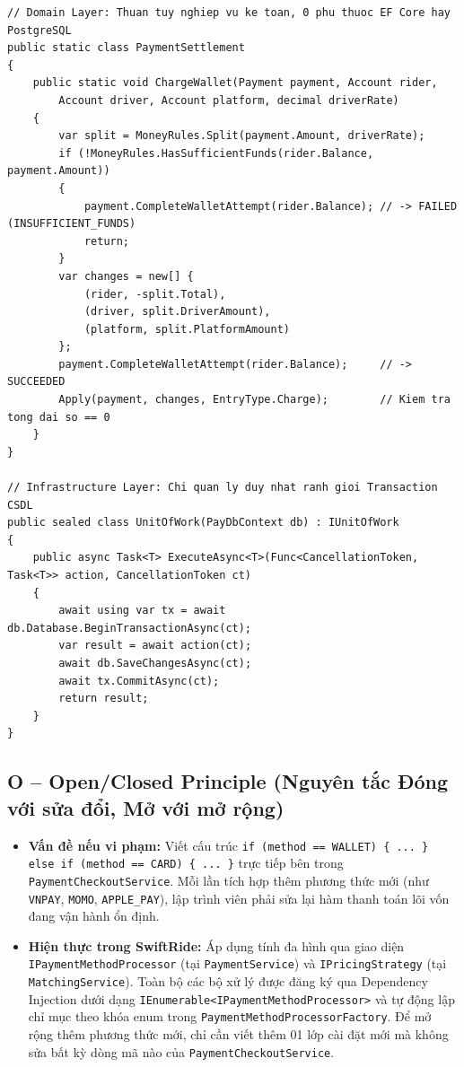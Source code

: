 \documentclass[12pt,a4paper]{article}
\begin{document}
\begin{lstlisting}[caption={SRP: Tach biet quy tac ket toan Domain (PaymentSettlement) khoi quan ly giao dich (UnitOfWork)}]
// Domain Layer: Thuan tuy nghiep vu ke toan, 0 phu thuoc EF Core hay PostgreSQL
public static class PaymentSettlement
{
    public static void ChargeWallet(Payment payment, Account rider,
        Account driver, Account platform, decimal driverRate)
    {
        var split = MoneyRules.Split(payment.Amount, driverRate);
        if (!MoneyRules.HasSufficientFunds(rider.Balance, payment.Amount))
        {
            payment.CompleteWalletAttempt(rider.Balance); // -> FAILED (INSUFFICIENT_FUNDS)
            return;
        }
        var changes = new[] {
            (rider, -split.Total),
            (driver, split.DriverAmount),
            (platform, split.PlatformAmount)
        };
        payment.CompleteWalletAttempt(rider.Balance);     // -> SUCCEEDED
        Apply(payment, changes, EntryType.Charge);        // Kiem tra tong dai so == 0
    }
}

// Infrastructure Layer: Chi quan ly duy nhat ranh gioi Transaction CSDL
public sealed class UnitOfWork(PayDbContext db) : IUnitOfWork
{
    public async Task<T> ExecuteAsync<T>(Func<CancellationToken, Task<T>> action, CancellationToken ct)
    {
        await using var tx = await db.Database.BeginTransactionAsync(ct);
        var result = await action(ct);
        await db.SaveChangesAsync(ct);
        await tx.CommitAsync(ct);
        return result;
    }
}
\end{lstlisting}

\subsection{O -- Open/Closed Principle (Nguyên tắc Đóng với sửa đổi, Mở với mở rộng)}
\begin{itemize}[nosep]
    \item \textbf{Vấn đề nếu vi phạm:} Viết cấu trúc \texttt{if (method == WALLET) \{ ... \} else if (method == CARD) \{ ... \}} trực tiếp bên trong \texttt{PaymentCheckoutService}. Mỗi lần tích hợp thêm phương thức mới (như \texttt{VNPAY}, \texttt{MOMO}, \texttt{APPLE\_PAY}), lập trình viên phải sửa lại hàm thanh toán lõi vốn đang vận hành ổn định.
    \item \textbf{Hiện thực trong SwiftRide:} Áp dụng tính đa hình qua giao diện \texttt{IPaymentMethodProcessor} (tại \texttt{PaymentService}) và \texttt{IPricingStrategy} (tại \texttt{MatchingService}). Toàn bộ các bộ xử lý được đăng ký qua Dependency Injection dưới dạng \texttt{IEnumerable<IPaymentMethodProcessor>} và tự động lập chỉ mục theo khóa enum trong \texttt{PaymentMethodProcessorFactory}. Để mở rộng thêm phương thức mới, chỉ cần viết thêm 01 lớp cài đặt mới mà không sửa bất kỳ dòng mã nào của \texttt{PaymentCheckoutService}.
\end{itemize}
\end{document}
